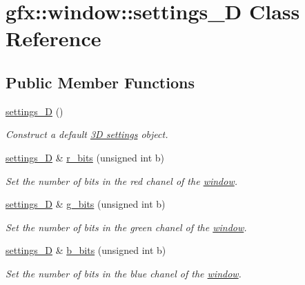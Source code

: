 \hypertarget{classgfx_1_1window_1_1settings__3D}{\section{gfx\-:\-:window\-:\-:settings\-\_\-D Class Reference}
\label{classgfx_1_1window_1_1settings__3D}
}
\subsection*{Public Member Functions}
\begin{DoxyCompactItemize}
\item 
\hyperlink{classgfx_1_1window_1_1settings__3D_ad719adf6e6b992ce5d1697ac4c6ebc04}{settings\-\_\-D} ()
\begin{DoxyCompactList}\small\item\em Construct a default \hyperlink{classgfx_1_1window_1_1settings__3D}{3\-D settings} object. \end{DoxyCompactList}\item 
\hyperlink{classgfx_1_1window_1_1settings__3D}{settings\-\_\-D} \& \hyperlink{classgfx_1_1window_1_1settings__3D_a1342a9c3063562dbde1ead662abd0d24}{r\-\_\-bits} (unsigned int b)
\begin{DoxyCompactList}\small\item\em Set the number of bits in the red chanel of the \hyperlink{classgfx_1_1window}{window}. \end{DoxyCompactList}\item 
\hyperlink{classgfx_1_1window_1_1settings__3D}{settings\-\_\-D} \& \hyperlink{classgfx_1_1window_1_1settings__3D_ad246e9c0329d2a65bb38e510b7030211}{g\-\_\-bits} (unsigned int b)
\begin{DoxyCompactList}\small\item\em Set the number of bits in the green chanel of the \hyperlink{classgfx_1_1window}{window}. \end{DoxyCompactList}\item 
\hyperlink{classgfx_1_1window_1_1settings__3D}{settings\-\_\-D} \& \hyperlink{classgfx_1_1window_1_1settings__3D_a42e6ec5d4c08617204fe198cb4169c31}{b\-\_\-bits} (unsigned int b)
\begin{DoxyCompactList}\small\item\em Set the number of bits in the blue chanel of the \hyperlink{classgfx_1_1window}{window}. \end{DoxyCompactList}\item 

\end{DoxyCompactItemize}
